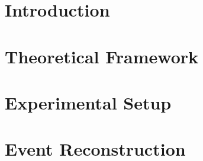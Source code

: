 \documentclass[12pt,a4paper,reqno,twoside,final]{scrbook}%
\numberwithin{equation}{subsection}
\begin{document}
 \chapter{Introduction}
 \label{ch:intro}
 

 \chapter{Theoretical Framework}
 \label{ch:theory}
 

 \chapter{Experimental Setup}
 \label{ch:expsetup}
 

 \chapter{Event Reconstruction}
 \label{ch:reconstruction}
 

\end{document}
